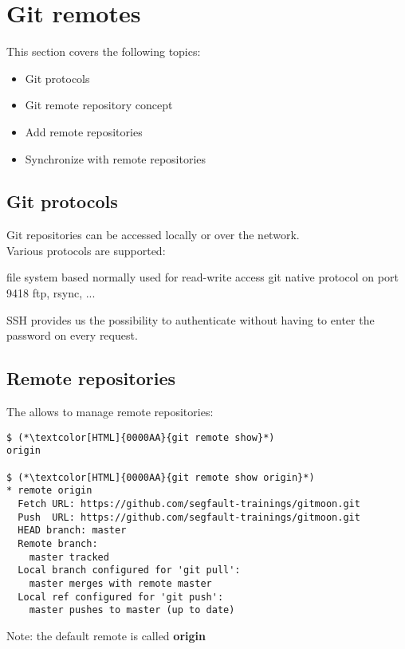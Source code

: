 \section{Git remotes}
\begin{frame}[fragile]
  \slidetitle
  This section covers the following topics:
  \begin{itemize}
    \item Git protocols
    \item Git remote repository concept
    \item Add remote repositories
    \item Synchronize with remote repositories
  \end{itemize}
\end{frame}

\subsection{Git protocols}
\begin{frame}[fragile]
  \subslidetitle
  Git repositories can be accessed locally or over the network.
  \\
  \vspace{1em}
  Various protocols are supported:
  \begin{itemize}
    {file system based}
      {normally used for read-write access}
      {git native protocol on port 9418}
   {ftp, rsync, ...}
  \end{itemize}
  \vspace{1em}
  SSH provides us the possibility to authenticate without having to enter the password on every request.
\end{frame}

\subsection{Remote repositories}
\begin{frame}[fragile]
  \subslidetitle
  The  allows to manage remote repositories:
  \begin{lstlisting}
$ (*\textcolor[HTML]{0000AA}{git remote show}*)
origin

$ (*\textcolor[HTML]{0000AA}{git remote show origin}*)
* remote origin
  Fetch URL: https://github.com/segfault-trainings/gitmoon.git
  Push  URL: https://github.com/segfault-trainings/gitmoon.git
  HEAD branch: master
  Remote branch:
    master tracked
  Local branch configured for 'git pull':
    master merges with remote master
  Local ref configured for 'git push':
    master pushes to master (up to date)
\end{lstlisting}
  \vspace{1em}
  Note: the default remote is called \textbf{origin}
\end{frame}

